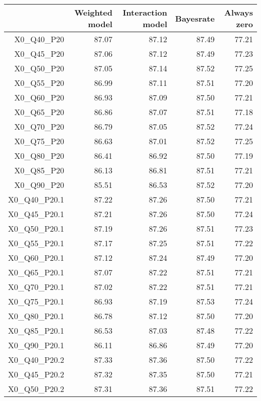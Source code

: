 \begin{table}[ht]
\centering
\begin{tabular}{rrrrr}
  \hline
 & Weighted model & Interaction model & Bayesrate & Always zero \\ 
  \hline
X0\_Q40\_P20 & 87.07 & 87.12 & 87.49 & 77.21 \\ 
  X0\_Q45\_P20 & 87.06 & 87.12 & 87.49 & 77.23 \\ 
  X0\_Q50\_P20 & 87.05 & 87.14 & 87.52 & 77.25 \\ 
  X0\_Q55\_P20 & 86.99 & 87.11 & 87.51 & 77.20 \\ 
  X0\_Q60\_P20 & 86.93 & 87.09 & 87.50 & 77.21 \\ 
  X0\_Q65\_P20 & 86.86 & 87.07 & 87.51 & 77.18 \\ 
  X0\_Q70\_P20 & 86.79 & 87.05 & 87.52 & 77.24 \\ 
  X0\_Q75\_P20 & 86.63 & 87.01 & 87.52 & 77.25 \\ 
  X0\_Q80\_P20 & 86.41 & 86.92 & 87.50 & 77.19 \\ 
  X0\_Q85\_P20 & 86.13 & 86.81 & 87.51 & 77.21 \\ 
  X0\_Q90\_P20 & 85.51 & 86.53 & 87.52 & 77.20 \\ 
  X0\_Q40\_P20.1 & 87.22 & 87.26 & 87.50 & 77.21 \\ 
  X0\_Q45\_P20.1 & 87.21 & 87.26 & 87.50 & 77.24 \\ 
  X0\_Q50\_P20.1 & 87.19 & 87.26 & 87.51 & 77.23 \\ 
  X0\_Q55\_P20.1 & 87.17 & 87.25 & 87.51 & 77.22 \\ 
  X0\_Q60\_P20.1 & 87.12 & 87.24 & 87.49 & 77.20 \\ 
  X0\_Q65\_P20.1 & 87.07 & 87.22 & 87.51 & 77.21 \\ 
  X0\_Q70\_P20.1 & 87.02 & 87.22 & 87.51 & 77.21 \\ 
  X0\_Q75\_P20.1 & 86.93 & 87.19 & 87.53 & 77.24 \\ 
  X0\_Q80\_P20.1 & 86.78 & 87.12 & 87.50 & 77.20 \\ 
  X0\_Q85\_P20.1 & 86.53 & 87.03 & 87.48 & 77.22 \\ 
  X0\_Q90\_P20.1 & 86.11 & 86.86 & 87.49 & 77.20 \\ 
  X0\_Q40\_P20.2 & 87.33 & 87.36 & 87.50 & 77.22 \\ 
  X0\_Q45\_P20.2 & 87.32 & 87.35 & 87.50 & 77.21 \\ 
  X0\_Q50\_P20.2 & 87.31 & 87.36 & 87.51 & 77.22 \\ 

\end{tabular}
\end{table}
